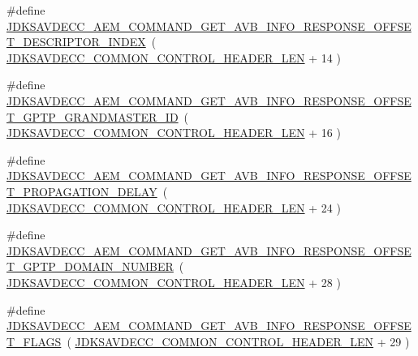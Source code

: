\begin{DoxyCompactItemize}
\item 
\#define \hyperlink{group__command__get__avb__info__response_ga05858d3ad028b2cf3c96b9948dc65afc}{J\+D\+K\+S\+A\+V\+D\+E\+C\+C\+\_\+\+A\+E\+M\+\_\+\+C\+O\+M\+M\+A\+N\+D\+\_\+\+G\+E\+T\+\_\+\+A\+V\+B\+\_\+\+I\+N\+F\+O\+\_\+\+R\+E\+S\+P\+O\+N\+S\+E\+\_\+\+O\+F\+F\+S\+E\+T\+\_\+\+D\+E\+S\+C\+R\+I\+P\+T\+O\+R\+\_\+\+I\+N\+D\+EX}~( \hyperlink{group__jdksavdecc__avtp__common__control__header_gaae84052886fb1bb42f3bc5f85b741dff}{J\+D\+K\+S\+A\+V\+D\+E\+C\+C\+\_\+\+C\+O\+M\+M\+O\+N\+\_\+\+C\+O\+N\+T\+R\+O\+L\+\_\+\+H\+E\+A\+D\+E\+R\+\_\+\+L\+EN} + 14 )
\item 
\#define \hyperlink{group__command__get__avb__info__response_ga129c88de1b6cbb871ac084d40881e1c1}{J\+D\+K\+S\+A\+V\+D\+E\+C\+C\+\_\+\+A\+E\+M\+\_\+\+C\+O\+M\+M\+A\+N\+D\+\_\+\+G\+E\+T\+\_\+\+A\+V\+B\+\_\+\+I\+N\+F\+O\+\_\+\+R\+E\+S\+P\+O\+N\+S\+E\+\_\+\+O\+F\+F\+S\+E\+T\+\_\+\+G\+P\+T\+P\+\_\+\+G\+R\+A\+N\+D\+M\+A\+S\+T\+E\+R\+\_\+\+ID}~( \hyperlink{group__jdksavdecc__avtp__common__control__header_gaae84052886fb1bb42f3bc5f85b741dff}{J\+D\+K\+S\+A\+V\+D\+E\+C\+C\+\_\+\+C\+O\+M\+M\+O\+N\+\_\+\+C\+O\+N\+T\+R\+O\+L\+\_\+\+H\+E\+A\+D\+E\+R\+\_\+\+L\+EN} + 16 )
\item 
\#define \hyperlink{group__command__get__avb__info__response_gada80bc8f717e30f221cdf84a32305297}{J\+D\+K\+S\+A\+V\+D\+E\+C\+C\+\_\+\+A\+E\+M\+\_\+\+C\+O\+M\+M\+A\+N\+D\+\_\+\+G\+E\+T\+\_\+\+A\+V\+B\+\_\+\+I\+N\+F\+O\+\_\+\+R\+E\+S\+P\+O\+N\+S\+E\+\_\+\+O\+F\+F\+S\+E\+T\+\_\+\+P\+R\+O\+P\+A\+G\+A\+T\+I\+O\+N\+\_\+\+D\+E\+L\+AY}~( \hyperlink{group__jdksavdecc__avtp__common__control__header_gaae84052886fb1bb42f3bc5f85b741dff}{J\+D\+K\+S\+A\+V\+D\+E\+C\+C\+\_\+\+C\+O\+M\+M\+O\+N\+\_\+\+C\+O\+N\+T\+R\+O\+L\+\_\+\+H\+E\+A\+D\+E\+R\+\_\+\+L\+EN} + 24 )
\item 
\#define \hyperlink{group__command__get__avb__info__response_gaec431d299308c85dd8cca8173378a39f}{J\+D\+K\+S\+A\+V\+D\+E\+C\+C\+\_\+\+A\+E\+M\+\_\+\+C\+O\+M\+M\+A\+N\+D\+\_\+\+G\+E\+T\+\_\+\+A\+V\+B\+\_\+\+I\+N\+F\+O\+\_\+\+R\+E\+S\+P\+O\+N\+S\+E\+\_\+\+O\+F\+F\+S\+E\+T\+\_\+\+G\+P\+T\+P\+\_\+\+D\+O\+M\+A\+I\+N\+\_\+\+N\+U\+M\+B\+ER}~( \hyperlink{group__jdksavdecc__avtp__common__control__header_gaae84052886fb1bb42f3bc5f85b741dff}{J\+D\+K\+S\+A\+V\+D\+E\+C\+C\+\_\+\+C\+O\+M\+M\+O\+N\+\_\+\+C\+O\+N\+T\+R\+O\+L\+\_\+\+H\+E\+A\+D\+E\+R\+\_\+\+L\+EN} + 28 )
\item 
\#define \hyperlink{group__command__get__avb__info__response_ga4c01585b69c22f5824552bec0127d77d}{J\+D\+K\+S\+A\+V\+D\+E\+C\+C\+\_\+\+A\+E\+M\+\_\+\+C\+O\+M\+M\+A\+N\+D\+\_\+\+G\+E\+T\+\_\+\+A\+V\+B\+\_\+\+I\+N\+F\+O\+\_\+\+R\+E\+S\+P\+O\+N\+S\+E\+\_\+\+O\+F\+F\+S\+E\+T\+\_\+\+F\+L\+A\+GS}~( \hyperlink{group__jdksavdecc__avtp__common__control__header_gaae84052886fb1bb42f3bc5f85b741dff}{J\+D\+K\+S\+A\+V\+D\+E\+C\+C\+\_\+\+C\+O\+M\+M\+O\+N\+\_\+\+C\+O\+N\+T\+R\+O\+L\+\_\+\+H\+E\+A\+D\+E\+R\+\_\+\+L\+EN} + 29 )

\end{DoxyCompactItemize}
